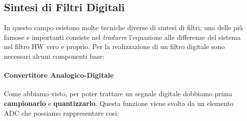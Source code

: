 \subsection{Sintesi di Filtri Digitali}
In questo campo esistono molte tecniche diverse di sintesi di filtri; una delle più famose e importanti consiste nel \textit{tradurre} l'equazione
alle differenze del sistema nel filtro HW vero e proprio. Per la realizzazione di un filtro digitale sono necessari alcuni componenti base:
\paragraph{Convertitore Analogico-Digitale}
Come abbiamo visto, per poter trattare un segnale digitale dobbiamo prima \textbf{campionarlo} e \textbf{quantizzarlo}. Questa funzione viene svolta 
da un elemento ADC che possiamo rappresentare cosi:
\begin{center}
\end{center}

